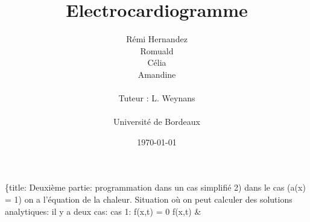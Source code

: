 \documentclass[a4paper,12pt,twoside]{report}
\title{
\vspace*{1in}
\textbf{Electrocardiogramme}}
\author{Rémi Hernandez\\
        Romuald\\
        Célia\\
        Amandine\\
		\vspace*{0.5in} \\		
		Tuteur : L. Weynans \\	
		\vspace*{0.5in} \\		
		Université de Bordeaux\\		
       }
\date{\today} %
\begin{document}
\maketitle %




\pagebreak
\hspace{0pt}

\vfill
\hspace{0pt}
\pagebreak




\cleardoublepage
\tableofcontents %




\{title: Deuxième partie: programmation dans un cas simplifié
2) dans le cas (a(x) = 1) on a l'équation de la chaleur. 
Situation où on peut calculer des solutions analytiques:
il y a deux cas: 
cas 1: 
f(x,t) = 0
f(x,t) & 
\end{document}
